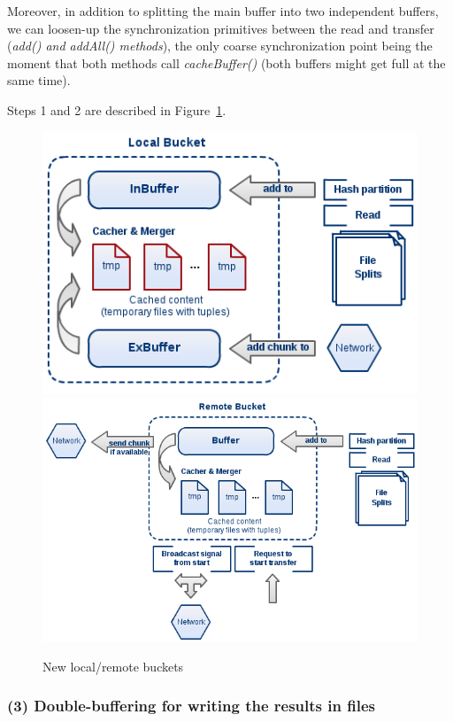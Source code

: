 Moreover, in addition to splitting the main buffer into two independent buffers, we can loosen-up the synchronization primitives between the read and transfer (\textit{add() and addAll() methods}), the only coarse synchronization point being the moment that both methods call \textit{cacheBuffer()} (both buffers might get full at the same time).

Steps 1 and 2 are described in Figure~\ref{fig:diag4}.

\pagebreak

\begin{figure}
\centering
\includegraphics[scale=0.5]{diag4a}
\linebreak
\linebreak
\centering
\includegraphics[scale=0.5]{diag4b}
\caption{New local/remote buckets}
\label{fig:diag4}
\end{figure}

% 
\subsubsection*{(3) Double-buffering for writing the results in files}


